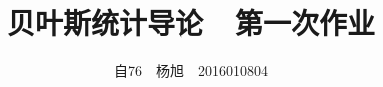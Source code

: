 \documentclass[UTF8]{article}
\title{贝叶斯统计导论\ \ 第一次作业}
\author{自76\ \ 杨旭\ \ 2016010804}
\begin{document}
 \maketitle

\section{}

\section{}

\section{}

\section{}
\end{document}
